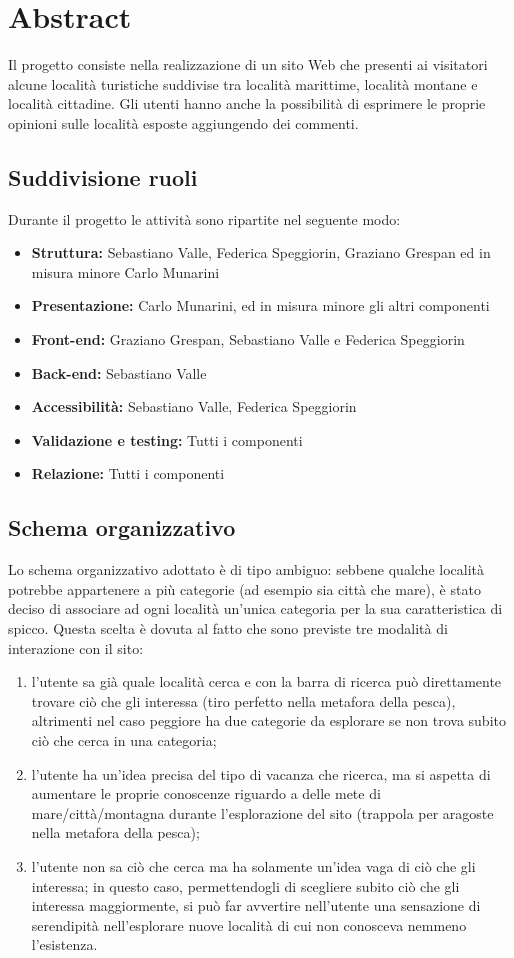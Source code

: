 \section{Abstract}
Il progetto consiste nella realizzazione di un sito Web che presenti ai
visitatori alcune località turistiche suddivise tra località marittime,
località montane e località cittadine.
Gli utenti hanno anche la possibilità di esprimere le proprie opinioni sulle
località esposte aggiungendo dei commenti.

\subsection{Suddivisione ruoli}
Durante il progetto le attività sono ripartite nel seguente modo:
\begin{itemize}
\item \textbf{Struttura:} Sebastiano Valle, Federica Speggiorin, Graziano Grespan ed in misura minore Carlo Munarini
\item \textbf{Presentazione:} Carlo Munarini, ed in misura minore gli altri componenti
\item \textbf{Front-end:} Graziano Grespan, Sebastiano Valle e Federica Speggiorin
\item \textbf{Back-end:} Sebastiano Valle
\item \textbf{Accessibilità:} Sebastiano Valle, Federica Speggiorin
\item \textbf{Validazione e testing:} Tutti i componenti
\item \textbf{Relazione:} Tutti i componenti
\end{itemize}

\subsection{Schema organizzativo}
Lo schema organizzativo adottato è di tipo ambiguo: sebbene qualche località potrebbe appartenere a più categorie (ad esempio sia città che mare), è stato deciso di associare ad ogni località un'unica categoria per la sua caratteristica di spicco.
Questa scelta è dovuta al fatto che sono previste tre modalità di interazione con il sito:
\begin{enumerate}
\item  l'utente sa già quale località cerca e con la barra di ricerca può direttamente trovare ciò che gli interessa (tiro perfetto nella metafora della pesca), altrimenti nel caso peggiore ha due categorie da esplorare se non trova subito ciò che cerca in una categoria;
\item l'utente ha un'idea precisa del tipo di vacanza che ricerca, ma si aspetta di aumentare le proprie conoscenze riguardo a delle mete di mare/città/montagna durante l'esplorazione del sito (trappola per aragoste nella metafora della pesca);
\item l'utente non sa ciò che cerca ma ha solamente un'idea vaga di ciò che gli interessa; in questo caso, permettendogli di scegliere subito ciò che gli interessa maggiormente, si può far avvertire nell'utente una sensazione di serendipità nell'esplorare nuove località di cui non conosceva nemmeno l'esistenza.
\end{enumerate}
